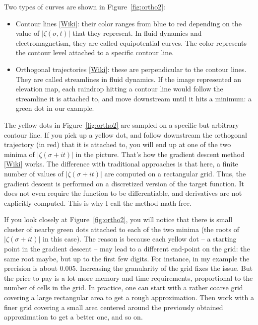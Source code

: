 \documentclass[oneside,10pt]{book}
\begin{document}
\noindent Two types of curves are shown in Figure~\ref{fig:ortho2}:\vspace{1ex}
\begin{itemize}
\item \textcolor{index}{Contour lines} [\href{https://en.wikipedia.org/wiki/Contour_line}{Wiki}]: their color ranges from blue to red depending on the value of $|\zeta(\sigma,t)|$ that they represent. In fluid dynamics and electromagnetism, they are called equipotential curves. The color represents the \textcolor{index}{contour level} attached to a specific contour line.
\item \textcolor{index}{Orthogonal trajectories} [\href{https://en.wikipedia.org/wiki/Orthogonal_trajectory}{Wiki}]: these are perpendicular to the contour lines. They are called streamlines in fluid dynamics. If the image represented an elevation map, each raindrop hitting a contour line would follow the streamline it is attached to, and move downstream until it hits a minimum: a green dot in our example.
\end{itemize}\vspace{1ex}

\noindent The yellow dots in Figure~\ref{fig:ortho2} are sampled on a specific but arbitrary contour line. If you pick up a yellow dot, and follow downstream the orthogonal trajectory (in red) that it is attached to, you will end up at one of the two minima of $|\zeta(\sigma+it)|$ in the picture.  That's how the \textcolor{index}{gradient descent method} [\href{https://en.wikipedia.org/wiki/Gradient_descent}{Wiki}] works. The difference with traditional approaches is that here, a finite number of values of $|\zeta(\sigma+it)|$ are computed on a
 rectangular grid. Thus, the gradient descent is performed on a discretized version of the target function. It does not even require the function to be differentiable, and derivatives are not explicitly computed. This is why I call the method math-free.

If you look closely at Figure~\ref{fig:ortho2}, you will notice that there is small cluster of nearby green dots attached to each of the two minima (the roots of $|\zeta(\sigma+it)|$ in this case). The reason is because each yellow dot -- a starting point in the gradient descent -- may lead to a different end-point on the grid: the same root maybe, but up to the first few digits. For instance, in my example the precision is about $0.005$.
Increasing the granularity of the grid
 fixes the issue. But the price to pay is a lot more memory and time requirements, proportional to the number of cells in the grid.  In practice, one can start with a rather coarse grid
 covering a large rectangular area to get
 a rough approximation. Then work with a finer grid covering a small area centered around the previously obtained approximation to get a better one, and so on.
\end{document}

